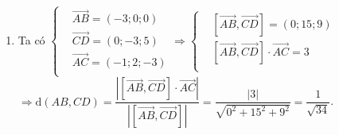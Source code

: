 \begin{vd}
{\begin{enumerate}
		Khoảng cách từ $A$ đến $(BCD)$ là $\mathrm{d}(A,(BCD))=\dfrac{3V_{ABCD}}{S_{\triangle BCD}}=\dfrac{3\cdot \dfrac{1}{2}}{\dfrac{\sqrt{137}}{2}}=\dfrac{3}{\sqrt{137}}$.
		\item Ta có $\left\{\begin{aligned}
		&\overrightarrow{AB}=(-3;0;0)\\
		&\overrightarrow{CD}=(0;-3;5)\\
		&\overrightarrow{AC}=(-1;2;-3)\\
		\end{aligned}\right. \Rightarrow \left\{\begin{aligned}
		&\left[\overrightarrow{AB},\overrightarrow{CD}\right]=(0;15;9)\\
		&\left[\overrightarrow{AB},\overrightarrow{CD}\right]\cdot\overrightarrow{AC}=3\\
		\end{aligned}\right.$\\
		$\Rightarrow \mathrm{d}(AB,CD)=\dfrac{\left|\left[\overrightarrow{AB},\overrightarrow{CD}\right]\cdot\overrightarrow{AC}\right|}{\left|\left[\overrightarrow{AB},\overrightarrow{CD}\right]\right|}=\dfrac{|3|}{\sqrt{0^2+15^2+9^2}}=\dfrac{1}{\sqrt{34}}$.
\end{enumerate}}
\end{vd}
